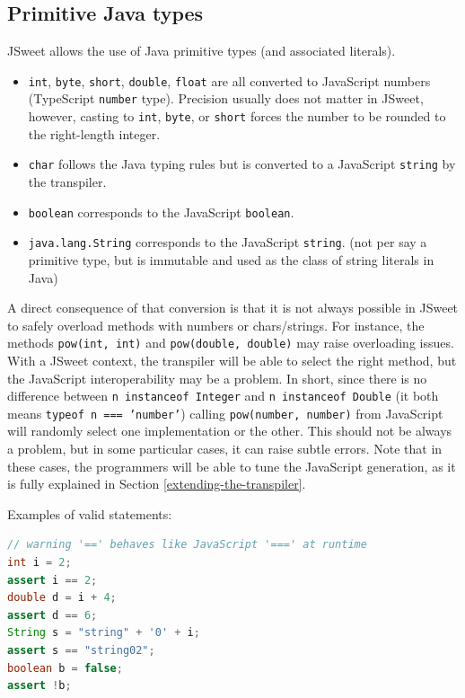 \documentclass[a4paper]{report}
\begin{document}
\subsection{Primitive Java types}

JSweet allows the use of Java primitive types (and associated literals).

\begin{itemize}
\item \texttt{int}, \texttt{byte}, \texttt{short}, \texttt{double}, \texttt{float} are all converted to JavaScript numbers (TypeScript \texttt{number} type). Precision usually does not matter in JSweet, however, casting to \texttt{int}, \texttt{byte}, or \texttt{short} forces the number to be rounded to the right-length integer.
\item \texttt{char} follows the Java typing rules but is converted to a JavaScript \texttt{string} by the transpiler.
\item \texttt{boolean} corresponds to the JavaScript \texttt{boolean}.
\item \texttt{java.lang.String} corresponds to the JavaScript \texttt{string}. (not per say a primitive type, but is immutable and used as the class of string literals in Java)
\end{itemize}

A direct consequence of that conversion is that it is not always possible in JSweet to safely overload methods with numbers or chars/strings. For instance, the methods \texttt{pow(int, int)} and \texttt{pow(double, double)} may raise overloading issues. With a JSweet context, the transpiler will be able to select the right method, but the JavaScript interoperability may be a problem. In short, since there is no difference between \texttt{n instanceof Integer} and \texttt{n instanceof Double} (it both means \texttt{typeof n === 'number'}) calling \texttt{pow(number, number)} from JavaScript will randomly select one implementation or the other. This should not be always a problem, but in some particular cases, it can raise subtle errors. Note that in these cases, the programmers will be able to tune the JavaScript generation, as it is fully explained in Section \ref{extending-the-transpiler}.

\noindent
Examples of valid statements:

\begin{lstlisting}[language=Java]
// warning '==' behaves like JavaScript '===' at runtime
int i = 2;
assert i == 2;
double d = i + 4;
assert d == 6;
String s = "string" + '0' + i;
assert s == "string02";
boolean b = false;
assert !b;
\end{lstlisting}
\end{document}
